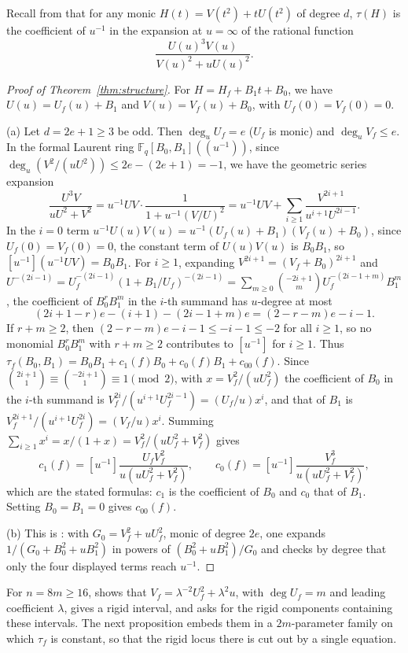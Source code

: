 \documentclass[11pt,a4paper]{amsart}
\theoremstyle{remark}
\numberwithin{equation}{section}
\newcommand{\Fq}{\mathbb{F}_q}
\begin{document}
Recall from \cite[Lemma~3.1]{ChenShort} that for any monic $H(t)=V(t^2)+tU(t^2)$ of degree $d$, $\tau(H)$ is the
coefficient of $u^{-1}$ in the expansion at $u=\infty$ of the rational function
\begin{equation}\label{eq:residue}
\frac{U(u)^3V(u)}{V(u)^2+uU(u)^2}.
\end{equation}

\begin{proof}[Proof of Theorem~\ref{thm:structure}]
For $H=H_f+B_1t+B_0$, we have $U(u)=U_f(u)+B_1$ and $V(u)=V_f(u)+B_0$, with $U_f(0)=V_f(0)=0$.

(a) Let $d=2e+1\ge 3$ be odd. Then $\deg_u U_f=e$ ($U_f$ is monic) and $\deg_u V_f\le e$. In the formal Laurent ring
$\Fq[B_0,B_1]((u^{-1}))$, since $\deg_u(V^2/(uU^2))\le 2e-(2e+1)=-1$, we have the geometric series expansion
\[
\frac{U^3V}{uU^2+V^2}=u^{-1}UV\cdot\frac{1}{1+u^{-1}(V/U)^2}
=u^{-1}UV+\sum_{i\ge 1}\frac{V^{2i+1}}{u^{i+1}U^{2i-1}}.
\]
In the $i=0$ term $u^{-1}U(u)V(u)=u^{-1}(U_f(u)+B_1)(V_f(u)+B_0)$, since $U_f(0)=V_f(0)=0$, the constant term of
$U(u)V(u)$ is $B_0B_1$, so $[u^{-1}](u^{-1}UV)=B_0B_1$. For $i\ge 1$, expanding $V^{2i+1}=(V_f+B_0)^{2i+1}$ and
$U^{-(2i-1)}=U_f^{-(2i-1)}(1+B_1/U_f)^{-(2i-1)}=\sum_{m\ge 0}\binom{-2i+1}{m}U_f^{-(2i-1+m)}B_1^m$, the coefficient of
$B_0^rB_1^m$ in the $i$-th summand has $u$-degree at most
\[
(2i+1-r)e-(i+1)-(2i-1+m)e=(2-r-m)e-i-1.
\]
If $r+m\ge 2$, then $(2-r-m)e-i-1\le -i-1\le -2$ for all $i\ge 1$, so no monomial $B_0^rB_1^m$ with $r+m\ge 2$
contributes to $[u^{-1}]$ for $i\ge 1$. Thus $\tau_f(B_0,B_1)=B_0B_1+c_1(f)B_0+c_0(f)B_1+c_{00}(f)$. Since
$\binom{2i+1}{1}\equiv\binom{-2i+1}{1}\equiv 1\pmod 2$, with $x=V_f^2/(uU_f^2)$ the coefficient of $B_0$ in the
$i$-th summand is $V_f^{2i}/(u^{i+1}U_f^{2i-1})=(U_f/u)x^i$, and that of $B_1$ is
$V_f^{2i+1}/(u^{i+1}U_f^{2i})=(V_f/u)x^i$. Summing $\sum_{i\ge1}x^i=x/(1+x)=V_f^2/(uU_f^2+V_f^2)$ gives
\[
c_1(f)=[u^{-1}]\frac{U_fV_f^2}{u(uU_f^2+V_f^2)},\qquad c_0(f)=[u^{-1}]\frac{V_f^3}{u(uU_f^2+V_f^2)},
\]
which are the stated formulas: $c_1$ is the coefficient of $B_0$ and $c_0$ that of $B_1$. Setting $B_0=B_1=0$ gives
$c_{00}(f)$.

(b) This is \cite[Theorem~3.2(b)]{ChenShort}: with $G_0=V_f^2+uU_f^2$, monic of degree $2e$, one expands
$1/(G_0+B_0^2+uB_1^2)$ in powers of $(B_0^2+uB_1^2)/G_0$ and checks by degree that only the four displayed terms reach
$u^{-1}$.
\end{proof}

For $n=8m\ge16$, \cite[Proposition~3.3]{ChenShort} shows that $V_f=\lambda^{-2}U_f^2+\lambda^2u$, with $\deg U_f=m$
and leading coefficient $\lambda$, gives a rigid interval, and \cite[Question~(1)]{ChenShort} asks for the rigid
components containing these intervals. The next proposition embeds them in a $2m$-parameter family on which
$\tau_f$ is constant, so that the rigid locus there is cut out by a single equation.
\end{document}
